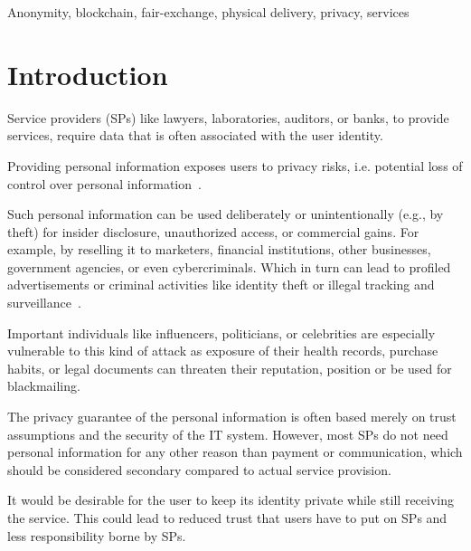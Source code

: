 \documentclass{ieeeaccess}
\begin{document}
\begin{keywords}
Anonymity, blockchain, fair-exchange, physical delivery, privacy, services
\end{keywords}

\titlepgskip=-21pt

\maketitle

\section{Introduction}
\label{sec:introduction}
Service providers (SPs) like lawyers, laboratories, auditors, or banks, to provide services, require data that is often associated with the user identity.

Providing personal information exposes users to privacy risks, i.e. potential loss of control over personal information~\cite{smithInformationPrivacyResearch2011}.

Such personal information can be used deliberately or unintentionally
(e.g., by theft) for insider disclosure, unauthorized access, or commercial gains. For example, by reselling it to marketers, financial institutions, other businesses, government agencies, or even cybercriminals. Which in turn can lead to profiled advertisements or criminal activities like identity theft or illegal tracking and surveillance~\cite{smithInformationPrivacyResearch2011}.

Important individuals like influencers, politicians, or celebrities are especially vulnerable to this kind of attack as exposure of their health records, purchase habits, or legal documents can threaten their reputation, position or be used for blackmailing.

The privacy guarantee of the personal information is often based merely on trust assumptions and the security of the IT system. However, most SPs do not need personal information for any other reason than payment or communication, which should be considered secondary compared to actual service provision.

It would be desirable for the user to keep its identity private while still receiving the service. This could lead to reduced trust that users have to put on SPs and less responsibility borne by SPs.
\end{document}
